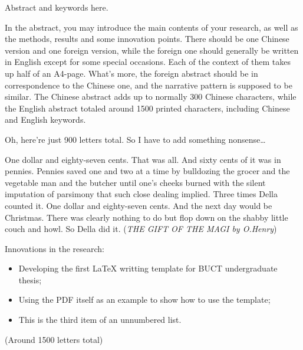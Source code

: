 \begin{abstracten}
	Abstract and keywords here.

	In the abstract, you may introduce the main contents of your research,
	as well as the methods, results and some innovation points. There should
	be one Chinese version and one foreign version, while the foreign one
	should generally be written in English except for some special occasions.
	Each of the context of them takes up half of an A4-page. What's more,
	the foreign abstract should be in correspondence to the Chinese one,
	and the narrative pattern is supposed to be similar. The Chinese abstract
	adds up to normally 300 Chinese characters, while the English abstract
	totaled around 1500 printed characters, including Chinese and English keywords.

	Oh, here're just 900 letters total. So I have to add something nonsense\dots

	One dollar and eighty-seven cents. That was all. And sixty cents of it was
	in pennies. Pennies saved one and two at a time by bulldozing the grocer
	and the vegetable man and the butcher until one's cheeks burned with the
	silent imputation of parsimony that such close dealing implied. Three times
	Della counted it. One dollar and eighty-seven cents. And the next day would
	be Christmas. There was clearly nothing to do but flop down on the shabby
	little couch and howl. So Della did it.
	(\textit{THE GIFT OF THE MAGI by O.Henry})

	Innovations in the research:
	\begin{itemize}
		\item Developing the first \LaTeX{} writting template for BUCT undergraduate thesis;
		\item Using the PDF itself as an example to show how to use the template;
		\item This is the third item of an unnumbered list.
	\end{itemize}

	(Around 1500 letters total)
\end{abstracten}